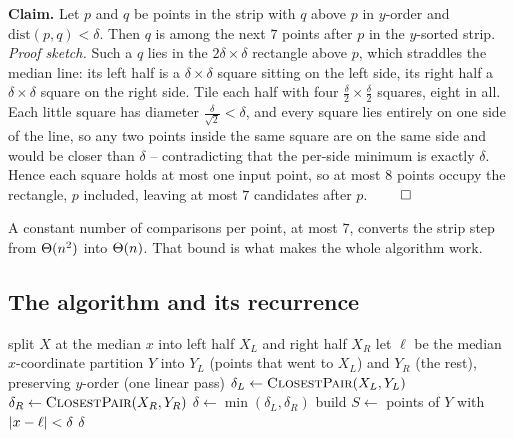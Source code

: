 \begin{formalbox}
\textbf{Claim.} Let $p$ and $q$ be points in the strip with $q$ above $p$ in
$y$-order and $\mathrm{dist}(p,q) < \delta$. Then $q$ is among the next $7$ points
after $p$ in the $y$-sorted strip. \\[2pt]
\emph{Proof sketch.} Such a $q$ lies in the $2\delta\times\delta$ rectangle above
$p$, which straddles the median line: its left half is a $\delta\times\delta$
square sitting on the left side, its right half a $\delta\times\delta$ square on
the right side. Tile each half with four $\tfrac{\delta}{2}\times\tfrac{\delta}{2}$
squares, eight in all. Each little square has diameter
$\tfrac{\delta}{\sqrt2}<\delta$, and every square lies entirely on one side of the
line, so any two points inside the same square are on the same side and would be
closer than $\delta$ -- contradicting that the per-side minimum is exactly
$\delta$. Hence each square holds at most one input point, so at most $8$ points
occupy the rectangle, $p$ included, leaving at most $7$ candidates after $p$.
$\qed$
\end{formalbox}

A constant number of comparisons per point, at most $7$, converts the strip step
from $\Theta(n^2)$ into $\Theta(n)$. That bound is what makes the whole algorithm work.

\subsection{The algorithm and its recurrence}

\begin{algorithm}[H]
\caption{\textsc{ClosestPair}($X, Y$)}
split $X$ at the median $x$ into left half $X_L$ and right half $X_R$\;
let $\ell$ be the median $x$-coordinate\;
partition $Y$ into $Y_L$ (points that went to $X_L$) and $Y_R$ (the rest), preserving $y$-order (one linear pass)\;
$\delta_L \leftarrow \textsc{ClosestPair}(X_L, Y_L)$\;
$\delta_R \leftarrow \textsc{ClosestPair}(X_R, Y_R)$\;
$\delta \leftarrow \min(\delta_L, \delta_R)$\;
build $S \leftarrow$ points of $Y$ with $\lvert x - \ell\rvert < \delta$ 
\Return $\delta$\;
\end{algorithm}

